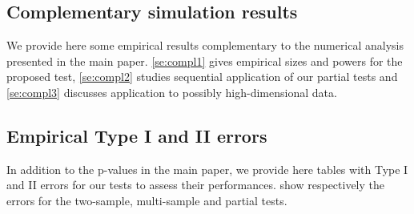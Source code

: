 \documentclass[12pt]{article}
\numberwithin{equation}{section}
\numberwithin{table}{section}
\numberwithin{thm}{section}
\numberwithin{defn}{section}
\numberwithin{lem}{section}
\numberwithin{prop}{section}
\numberwithin{cor}{section}
\numberwithin{rem}{section}
\begin{document}
\begin{appendix}

\section{Complementary simulation results} \label{se:compl}
We provide here some empirical results complementary to the numerical analysis presented in the main paper. \autoref{se:compl1} gives empirical sizes and powers for the proposed test, 
\autoref{se:compl2} studies sequential application of our partial tests and \autoref{se:compl3} discusses application to possibly high-dimensional data.

\subsection{Empirical Type I and II errors} \label{se:compl1}
In addition to the p-values in the main paper, we provide here tables with Type I and II errors for our tests to assess their performances.  show respectively the errors for the two-sample, multi-sample and partial tests.


\end{appendix}
\end{document}

